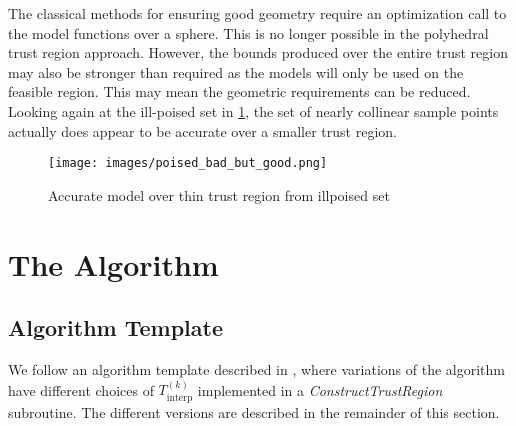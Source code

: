 \documentclass{article}
\theoremstyle{case}
\newcommand{\sampletrk}{{T_{\text{interp}}^{(k)}}}
\begin{document}
The classical methods for ensuring good geometry require an optimization call to the model functions over a sphere.
This is no longer possible in the polyhedral trust region approach.
However, the bounds produced over the entire trust region may also be stronger than required as the models will only be used on the feasible region.
This may mean the geometric requirements can be reduced.
Looking again at the ill-poised set in \cref{aoip}, the set of nearly collinear sample points actually does appear to be accurate over a smaller trust region.


\begin{figure}[h]
    \centering
    \texttt{[image: images/poised\_bad\_but\_good.png]}
    \caption{Accurate model over thin trust region from illpoised set}
    \label{aoip}
\end{figure}



\section{The Algorithm}


\subsection{Algorithm Template}

We follow an algorithm template described in \cite{doi:10.1080/10556788.2015.1026968}, where variations of the algorithm have different choices of $ \sampletrk $ implemented in a \emph{ConstructTrustRegion} subroutine.
The different versions are described in the remainder of this section.

\end{document}
